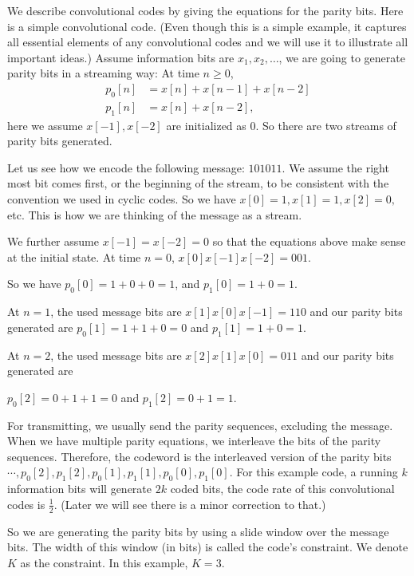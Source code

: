 We describe convolutional codes by giving the
equations for the parity bits.  Here is a simple convolutional code. (Even though this is a simple example, it captures all essential elements of any convolutional codes and we will use it to illustrate all important ideas.)
Assume information bits are \(x_1, x_2, \ldots\), we are going to generate parity bits in a streaming way: At time \(n \geq 0\), 
\begin{align*}
p_0[n] &= x[n] + x[n-1] + x[n-2] \\
p_1[n] &= x[n] + x[n-2],    
\end{align*}
here we assume \(x[-1], x[-2]\) are initialized as \(0\). So there are two streams of parity bits generated. 

Let us see how we encode the following message: \(101011\). We assume the right most bit comes first, or the beginning of the stream, to be consistent with the convention we used in cyclic codes. So we have \(x[0] = 1, x[1] = 1, x[2] = 0, \) etc.  This is how we are thinking of the message as a stream.

We further assume \(x[-1] = x[-2] = 0\) so that the equations above make sense at the initial state. At time \(n=0\), \(x[0]x[-1]x[-2] = 001\).  

So we have \(p_0[0] = 1 + 0 + 0 = 1\), and \(p_1[0] = 1 + 0 = 1\).

At \(n=1\), the used message bits are \(x[1]x[0]x[-1]=110\) and our parity bits generated are \(p_0[1] = 1 + 1 + 0 = 0\) and \(p_1[1] = 1 + 0 = 1\).

At \(n=2\), the used message bits are \(x[2]x[1]x[0]=011\) and our parity bits generated are 

\(p_0[2] = 0 + 1 + 1 = 0\) and \(p_1[2] = 0 + 1 = 1\).

For transmitting, we usually send the parity sequences, excluding the message.  When we have multiple parity equations, we interleave the bits of the parity sequences.  Therefore, the codeword is the interleaved version of the parity bits \( \cdots, p_0[2], p_1[2], p_0[1], p_1[1], p_0[0], p_1[0]\). For this example code, a running \(k\) information bits will generate \(2k\) coded bits, the code rate of this convolutional codes is \(\frac{1}{2}.\) (Later we will see there is a minor correction to that.)


So we are generating the parity bits by using a slide window over the message bits. The width of this window (in bits) is called the code's constraint. We denote \(K\) as the constraint. In this example, \(K=3.\)


